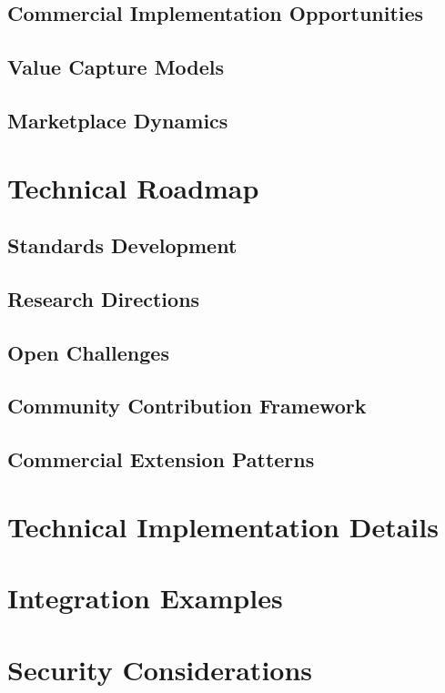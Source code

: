 \documentclass[11pt]{article}
\begin{document}
\subsection{Commercial Implementation Opportunities}
\subsection{Value Capture Models}
\subsection{Marketplace Dynamics}

\section{Technical Roadmap}
\subsection{Standards Development}
\subsection{Research Directions}
\subsection{Open Challenges}
\subsection{Community Contribution Framework}
\subsection{Commercial Extension Patterns}




\appendix
\section{Technical Implementation Details}
\section{Integration Examples}
\section{Security Considerations}
\end{document}
